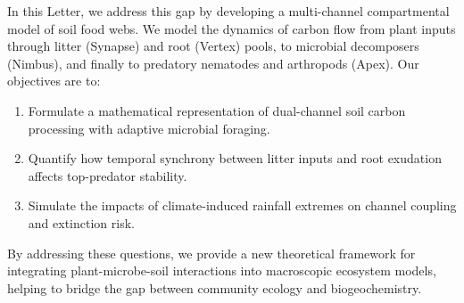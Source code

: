 In this Letter, we address this gap by developing a multi-channel compartmental model of soil food webs. We model the dynamics of carbon flow from plant inputs through litter (Synapse) and root (Vertex) pools, to microbial decomposers (Nimbus), and finally to predatory nematodes and arthropods (Apex). Our objectives are to:
\begin{enumerate}[label=\sffamily\arabic*.]
\item Formulate a mathematical representation of dual-channel soil carbon processing with adaptive microbial foraging.
\item Quantify how temporal synchrony between litter inputs and root exudation affects top-predator stability.
\item Simulate the impacts of climate-induced rainfall extremes on channel coupling and extinction risk.
\end{enumerate}
By addressing these questions, we provide a new theoretical framework for integrating plant-microbe-soil interactions into macroscopic ecosystem models, helping to bridge the gap between community ecology and biogeochemistry.
